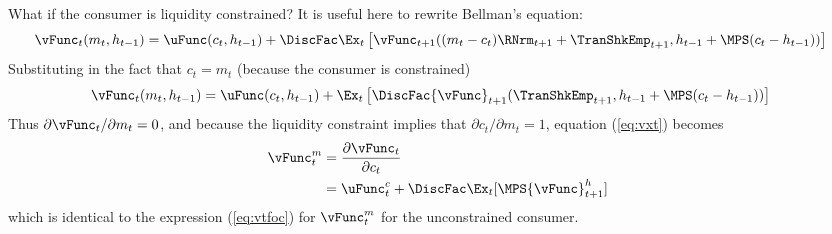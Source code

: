 \documentclass[titlepage, headings=optiontotocandhead]{\econtex}
\begin{document}
{  What if the consumer is liquidity constrained?  It is useful here to 
  rewrite Bellman's equation:
  \begin{equation}\begin{gathered}\begin{aligned}
        {\vFunc}_{t}({m}_{t},h_{t-1})  & = \uFunc({c}_{t},h_{t-1}) +  \DiscFac \Ex_{t}
        \left[{\vFunc}_{t+1}(({m}_{t}-{c}_{t})\RNrm_{t+1}+{\TranShkEmp}_{t+1},h_{t-1}+\MPS({c}_{t}-h_{t-1}))
        \right] \nonumber
      \end{aligned}\end{gathered}\end{equation}
  Substituting in the fact that ${c}_{t}={m}_{t}$ (because the consumer is constrained)
  \begin{equation}\begin{gathered}\begin{aligned}
        {\vFunc}_{t}({m}_{t},h_{t-1})  & = \uFunc({c}_{t},h_{t-1}) +  \Ex_{t}\left[\DiscFac
          {\vFunc}_{t+1}({\TranShkEmp}_{t+1},h_{t-1}+\MPS({c}_{t}-h_{t-1}))\right]
        \nonumber
      \end{aligned}\end{gathered}\end{equation}
  Thus $\partial {\vFunc}_{t}/\partial {m}_{t} = 0$, and because the liquidity
  constraint implies that $\partial {c}_{t}/\partial {m}_{t} = 1$,
  equation (\ref{eq:vxt}) becomes
  \begin{equation}\begin{gathered}\begin{aligned}
        {\vFunc}_{t}^{m}   & =  \frac{\partial {\vFunc}_{t}}{\partial {c}_{t}}
        \\              & = \uFunc_{t}^{c} + \DiscFac \Ex_{t} [\MPS {\vFunc}_{t+1}^{h}]
      \end{aligned}\end{gathered}\end{equation}
  which is identical to the expression (\ref{eq:vtfoc}) for ${\vFunc}_{t}^{m}$
  for the unconstrained consumer.

}
\end{document}
